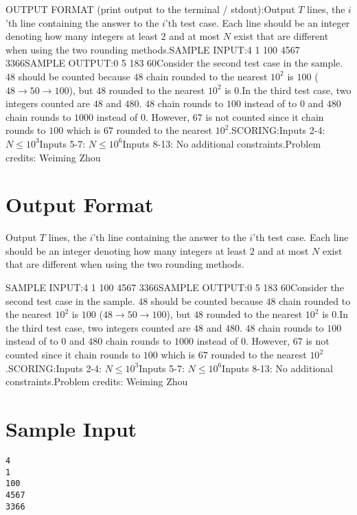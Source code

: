 \documentclass[12pt]{article}
\begin{document}
OUTPUT FORMAT (print output to the terminal / stdout):Output $T$ lines, the $i$'th line containing the answer to the $i$'th test case.
Each line should be an integer denoting how many integers at least $2$ and at
most $N$ exist that are different when using the two rounding methods.SAMPLE INPUT:4
1
100
4567
3366SAMPLE OUTPUT:0
5
183
60Consider the second test case in the sample. $48$ should be counted because $48$
chain rounded to the nearest $10^2$ is $100$ ($48\to 50\to 100$), but $48$
rounded to the nearest $10^2$ is
$0$.In the third test case, two integers counted are $48$ and $480$. $48$ chain 
rounds to $100$ instead of to $0$ and $480$ chain rounds to $1000$ instead of
$0$.  However, $67$ is not counted since it chain rounds to $100$ which is $67$
rounded to the nearest $10^2$.SCORING:Inputs 2-4: $N\le 10^3$Inputs 5-7: $N\le 10^6$Inputs 8-13: No additional constraints.Problem credits: Weiming Zhou

\section*{Output Format}
Output $T$ lines, the $i$'th line containing the answer to the $i$'th test case.
Each line should be an integer denoting how many integers at least $2$ and at
most $N$ exist that are different when using the two rounding methods.

SAMPLE INPUT:4
1
100
4567
3366SAMPLE OUTPUT:0
5
183
60Consider the second test case in the sample. $48$ should be counted because $48$
chain rounded to the nearest $10^2$ is $100$ ($48\to 50\to 100$), but $48$
rounded to the nearest $10^2$ is
$0$.In the third test case, two integers counted are $48$ and $480$. $48$ chain 
rounds to $100$ instead of to $0$ and $480$ chain rounds to $1000$ instead of
$0$.  However, $67$ is not counted since it chain rounds to $100$ which is $67$
rounded to the nearest $10^2$.SCORING:Inputs 2-4: $N\le 10^3$Inputs 5-7: $N\le 10^6$Inputs 8-13: No additional constraints.Problem credits: Weiming Zhou

\section*{Sample Input}
\begin{verbatim}
4
1
100
4567
3366
\end{verbatim}
\end{document}
